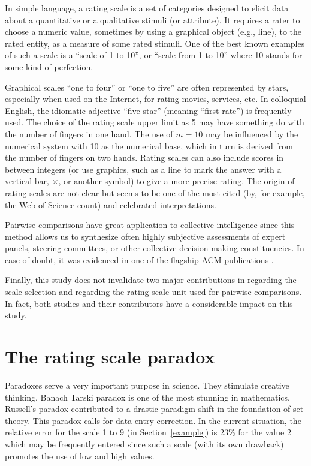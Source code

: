 \documentclass [12pt]{article}
\begin{document}
In simple language, a rating scale is a set of categories designed to elicit data about a quantitative or a qualitative stimuli (or attribute). It requires a rater to choose a numeric value, sometimes by using a graphical object (e.g., line), to the rated entity, as a measure of some rated stimuli.
One of the best known examples of such a scale is a ``scale of 1 to 10'', or ``scale from 1 to 10'' where 10 stands for some kind of perfection.


Graphical scales ``one to four'' or ``one to five'' are often represented by stars, especially when used on the Internet, for rating movies, services, etc. In colloquial English, the idiomatic adjective ``five-star'' (meaning ``first-rate'') is frequently used. The choice of the rating scale upper limit as 5 may have something do with the number of fingers in one hand. The use of $m=10$ may be influenced by the numerical system with 10 as the numerical base, which in turn is derived from the number of fingers on two hands. Rating scales can also include scores in between integers (or use graphics, such as a line to mark the answer with a vertical bar, $\times$, or another symbol) to give a more precise rating. The origin of rating scales are not clear but \cite{DA1978} seems to be one of the most cited (by, for example, the Web of Science count) and celebrated interpretations.

Pairwise comparisons have great application to collective intelligence since this method allows us to synthesize often highly subjective assessments of expert panels, steering committees, or other collective decision making constituencies. 
In case of doubt, it was evidenced in one of the flagship ACM publications \cite{FHH2010}.
 
Finally, this study does not invalidate two major contributions in \cite{DXLD2008} regarding the scale selection and \cite{CW2010} regarding the rating scale unit used for pairwise comparisons. In fact, both studies and their contributors have a considerable impact on this study. 
\section{The rating scale paradox}

Paradoxes serve a very important purpose in science. They stimulate creative thinking. Banach Tarski paradox is one of the most stunning in mathematics. Russell's paradox contributed to a drastic paradigm shift in the foundation of set theory. This paradox calls for data entry correction. In the current situation, the relative error for the scale 1 to 9 (in Section~\ref{example}) is 23\% for the value 2 which may be frequently entered since such a scale (with its own drawback) promotes the use of low and high values.\\
\end{document}
